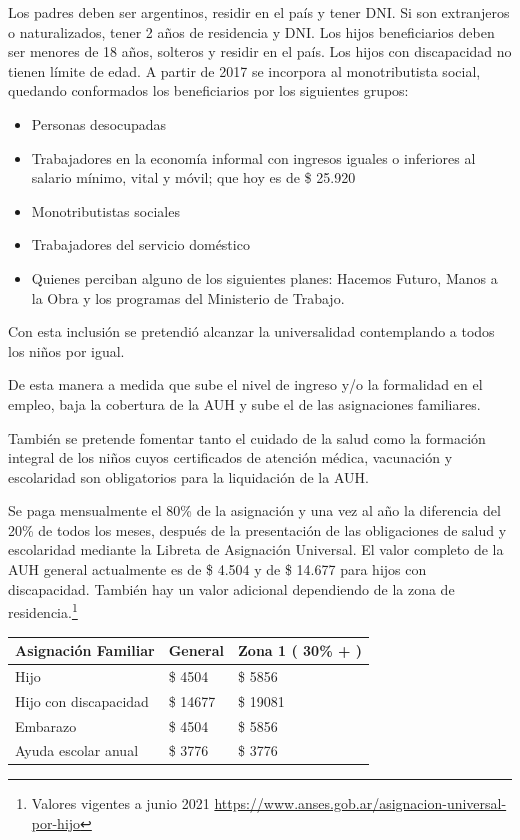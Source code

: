 \documentclass[
  12,
]{article}
\begin{document}
Los padres deben ser argentinos, residir en el país y tener DNI. Si son
extranjeros o naturalizados, tener 2 años de residencia y DNI. Los hijos
beneficiarios deben ser menores de 18 años, solteros y residir en el
país. Los hijos con discapacidad no tienen límite de edad. A partir de
2017 se incorpora al monotributista social, quedando conformados los
beneficiarios por los siguientes grupos:

\begin{itemize}
\item
  Personas desocupadas
\item
  Trabajadores en la economía informal con ingresos iguales o inferiores
  al salario mínimo, vital y móvil; que hoy es de \$ 25.920
\item
  Monotributistas sociales
\item
  Trabajadores del servicio doméstico
\item
  Quienes perciban alguno de los siguientes planes: Hacemos Futuro,
  Manos a la Obra y los programas del Ministerio de Trabajo.
\end{itemize}

Con esta inclusión se pretendió alcanzar la universalidad contemplando a
todos los niños por igual.

De esta manera a medida que sube el nivel de ingreso y/o la formalidad
en el empleo, baja la cobertura de la AUH y sube el de las asignaciones
familiares.

También se pretende fomentar tanto el cuidado de la salud como la
formación integral de los niños cuyos certificados de atención médica,
vacunación y escolaridad son obligatorios para la liquidación de la AUH.

Se paga mensualmente el 80\% de la asignación y una vez al año la
diferencia del 20\% de todos los meses, después de la presentación de
las obligaciones de salud y escolaridad mediante la Libreta de
Asignación Universal. El valor completo de la AUH general actualmente es
de \$ 4.504 y de \$ 14.677 para hijos con discapacidad. También hay un
valor adicional dependiendo de la zona de residencia.\footnote{Valores
  vigentes a junio 2021
  \url{https://www.anses.gob.ar/asignacion-universal-por-hijo}}

\begin{longtable}[]{@{}lll@{}}
\toprule
Asignación Familiar & General & Zona 1 ( 30\% + )\tabularnewline
\midrule
\endhead
Hijo & \$ 4504 & \$ 5856\tabularnewline
Hijo con discapacidad & \$ 14677 & \$ 19081\tabularnewline
Embarazo & \$ 4504 & \$ 5856\tabularnewline
Ayuda escolar anual & \$ 3776 & \$ 3776\tabularnewline
\bottomrule
\end{longtable}
\end{document}
